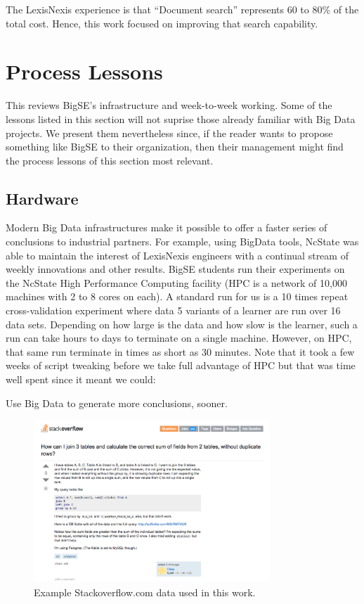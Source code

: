 \documentclass{sig-alternate-05-2015}
\theoremstyle{break}
\begin{document}
The LexisNexis experience is that
``Document search'' represents 60 to 80\% of the total  cost. Hence, this
work focused on improving that search capability. 
 
 


\section{Process Lessons}
This reviews BigSE's  infrastructure
and week-to-week working.  Some of the lessons listed in this section will not
suprise those already familiar with Big  Data projects. We present
them nevertheless since, if the
reader wants to propose something like BigSE to their organization, 
then  their management might find the process lessons of
this section
most relevant.


\subsection{Hardware}

Modern Big Data
 infrastructures make it possible to offer a
 faster series of conclusions to industrial partners.
For example, using BigData tools,
NcState was able to maintain the interest
of LexisNexis engineers with a continual stream of
weekly innovations and other results. 
 BigSE students run their experiments on the   NcState
High Performance Computing facility (HPC is a network of 10,000 machines with 2 to 8 cores on each).
A standard run for us is a 10 times repeat cross-validation experiment where data
5 variants of a learner are run over 16 data sets. Depending on how large
is the data and how slow is the learner, such a run can take hours to days to 
terminate on a single machine.  However, on HPC, that same run terminate in times
as short as 30 minutes. Note that it took a few
weeks of script tweaking before we take full   advantage
of HPC but that was time well spent since it meant we could:
\begin{lesson}
Use Big Data     to generate
more conclusions, sooner.
\end{lesson}  
\begin{figure}
\includegraphics[width=3.5in]{fig/example.png}
\caption{Example Stackoverflow.com data used in this work.}\label{fig:example}
\end{figure}
\end{document}
